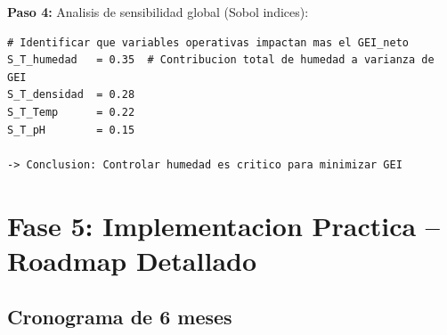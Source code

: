 \documentclass[12pt]{article}
\begin{document}
\textbf{Paso 4:} Analisis de sensibilidad global (Sobol indices):

\begin{lstlisting}[caption=Analisis de sensibilidad global]
# Identificar que variables operativas impactan mas el GEI_neto
S_T_humedad   = 0.35  # Contribucion total de humedad a varianza de GEI
S_T_densidad  = 0.28
S_T_Temp      = 0.22
S_T_pH        = 0.15

-> Conclusion: Controlar humedad es critico para minimizar GEI
\end{lstlisting}

\newpage

\section{Fase 5: Implementacion Practica -- Roadmap Detallado}

\subsection{Cronograma de 6 meses}
\end{document}
